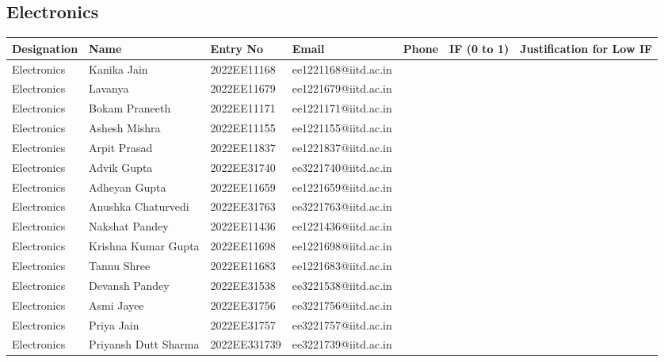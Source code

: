 \documentclass[a4paper,12pt]{article}
\begin{document}
\subsection{Electronics}
\begin{longtable}[c]{|l|l|l|l|l|l|l|}
\hline
\textbf{Designation} & \textbf{Name} & \textbf{Entry No} & \textbf{Email} & \textbf{Phone} & \textbf{IF (0 to 1)} & \textbf{Justification for Low IF} \\
\hline
Electronics & Kanika Jain & 2022EE11168 & ee1221168@iitd.ac.in &  &  &  \\ \hline
Electronics & Lavanya & 2022EE11679 & ee1221679@iitd.ac.in &  &  &  \\ \hline
Electronics & Bokam Praneeth & 2022EE11171 & ee1221171@iitd.ac.in &  &  &  \\ \hline
Electronics & Ashesh Mishra & 2022EE11155 & ee1221155@iitd.ac.in &  &  &  \\ \hline
Electronics & Arpit Prasad & 2022EE11837 & ee1221837@iitd.ac.in &  &  &  \\ \hline
Electronics & Advik Gupta & 2022EE31740 & ee3221740@iitd.ac.in &  &  &  \\ \hline
Electronics & Adheyan Gupta & 2022EE11659 & ee1221659@iitd.ac.in &  &  &  \\ \hline
Electronics & Anushka Chaturvedi & 2022EE31763 & ee3221763@iitd.ac.in &  &  &  \\ \hline
Electronics & Nakshat Pandey & 2022EE11436 & ee1221436@iitd.ac.in &  &  &  \\ \hline
Electronics & Krishna Kumar Gupta & 2022EE11698 & ee1221698@iitd.ac.in &  &  &  \\ \hline
Electronics & Tannu Shree & 2022EE11683 & ee1221683@iitd.ac.in &  &  &  \\ \hline
Electronics & Devansh Pandey & 2022EE31538 & ee3221538@iitd.ac.in &  &  &  \\ \hline
Electronics & Asmi Jayee & 2022EE31756 & ee3221756@iitd.ac.in &  &  &  \\ \hline
Electronics & Priya Jain & 2022EE31757 & ee3221757@iitd.ac.in &  &  &  \\ \hline
Electronics & Priyansh Dutt Sharma & 2022EE331739 & ee3221739@iitd.ac.in &  &  &  \\ \hline
\end{longtable}
\end{document}
